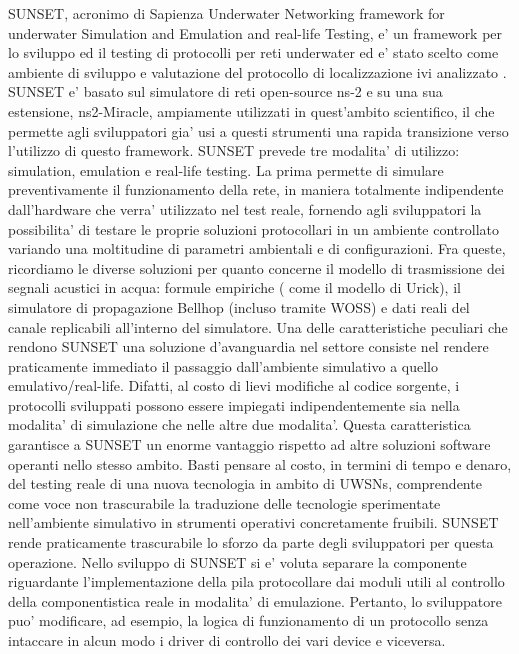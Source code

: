 \documentclass[Lau,binding=0.6cm]{sapthesis}
\begin{document}
SUNSET, acronimo di Sapienza Underwater Networking framework for underwater Simulation and Emulation and real-life Testing, e' un framework per lo sviluppo ed il testing di protocolli per reti underwater ed e' stato scelto come ambiente di sviluppo e valutazione del protocollo di localizzazione ivi analizzato \cite{sunset}.\newline
SUNSET e' basato sul simulatore di reti open-source ns-2 e su una sua estensione, ns2-Miracle, ampiamente utilizzati in quest'ambito scientifico, il che permette agli sviluppatori gia' usi a questi strumenti una rapida transizione verso l'utilizzo di questo framework.
SUNSET prevede tre modalita' di utilizzo: simulation, emulation e real-life testing.
La prima permette di simulare preventivamente il funzionamento della rete, in maniera totalmente indipendente dall'hardware che verra' utilizzato nel test reale, fornendo agli sviluppatori la possibilita' di testare le proprie soluzioni protocollari in un ambiente controllato variando una moltitudine di parametri ambientali e di configurazioni. Fra queste, ricordiamo le diverse soluzioni per quanto concerne il modello di trasmissione dei segnali acustici in acqua: formule empiriche ( come il modello di Urick), il simulatore di propagazione Bellhop (incluso tramite WOSS) e dati reali del canale replicabili all'interno del simulatore.
\newline
Una delle caratteristiche peculiari che rendono SUNSET una soluzione d'avanguardia nel settore consiste nel rendere praticamente immediato il passaggio dall'ambiente simulativo a quello emulativo/real-life. Difatti, al costo di lievi modifiche al codice sorgente, i protocolli sviluppati possono essere impiegati indipendentemente sia nella modalita' di simulazione che nelle altre due modalita'. Questa caratteristica garantisce a SUNSET un enorme vantaggio rispetto ad altre soluzioni software operanti nello stesso ambito. Basti pensare al costo, in termini di tempo e denaro, del testing reale di una nuova tecnologia in ambito di UWSNs, comprendente come voce non trascurabile la traduzione delle tecnologie sperimentate nell'ambiente simulativo in strumenti operativi concretamente fruibili. SUNSET rende praticamente trascurabile lo sforzo da parte degli sviluppatori per questa operazione.
\newline
Nello sviluppo di SUNSET si e' voluta separare la componente riguardante l'implementazione della pila protocollare dai moduli utili al controllo della componentistica reale in modalita' di emulazione. Pertanto, lo sviluppatore puo' modificare, ad esempio, la logica di funzionamento di un protocollo senza intaccare in alcun modo i driver di controllo dei vari device e viceversa.
\end{document}
